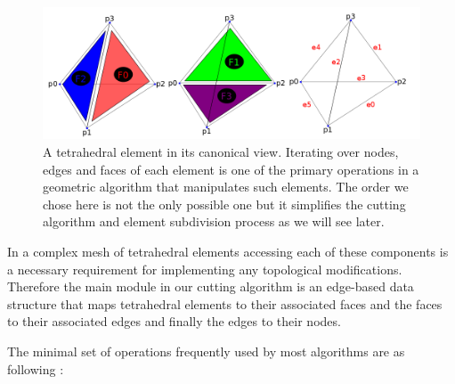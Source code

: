 \begin{figure}[H]
  \centering
  \includegraphics[width=1.0\linewidth]{figures/cutting/tetconfig3.png}
  \caption{\label{fig:tetconfig3}
  {A tetrahedral element in its canonical view. Iterating over nodes, edges and faces of each element is
  one of the primary operations in a geometric algorithm that manipulates such elements. The order we chose here is not the
  only possible one but it simplifies the cutting algorithm and element subdivision process as we will see later.}
}
\end{figure}


In a complex mesh of tetrahedral elements accessing each of these components is a necessary requirement for 
implementing any topological modifications. Therefore the main module in our cutting algorithm is an edge-based
data structure that maps tetrahedral elements to their associated faces and the faces to their associated edges and
finally the edges to their nodes. 

The minimal set of operations frequently used by most algorithms are as following \cite{Mario2010PolygonMesh}:

